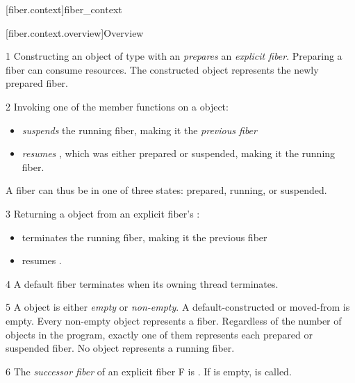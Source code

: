 
\setcounter{section}{32}
\setcounter{subsection}{11}
\setcounter{secnumdepth}{4}

\cbstart

[fiber.context]{fiber\_context}

[fiber.context.overview]{Overview}

1 Constructing an object of type \fiber with an \entryfn \emph{prepares}
an \emph{explicit fiber}. Preparing a fiber can consume resources. The
constructed \fiber object represents the newly prepared fiber.

2 Invoking one of the \anyresume member functions on a \fiber object:
\begin{itemize}
    \item \emph{suspends} the running fiber, making it the \emph{previous fiber}
    \item \emph{resumes} \thisfiber, which was either prepared or suspended, making
          it the running fiber.
\end{itemize}
A fiber can thus be in one of three states: prepared, running, or suspended.

3 Returning a \fiber object from an explicit fiber's \entryfn:
\begin{itemize}
    \item terminates the running fiber, making it the previous fiber
    \item resumes .
\end{itemize}

4 A default fiber terminates when its owning thread terminates.

5 A \fiber object is either \emph{empty} or \emph{non-empty}. A
default-constructed or moved-from \fiber is empty. Every non-empty \fiber object
represents a fiber. Regardless of the number of \fiber objects in the program,
exactly one of them represents each prepared or suspended fiber. No \fiber
object represents a running fiber.

6 The \emph{successor fiber} of an explicit fiber F is . If  is empty, \termn is
called.



